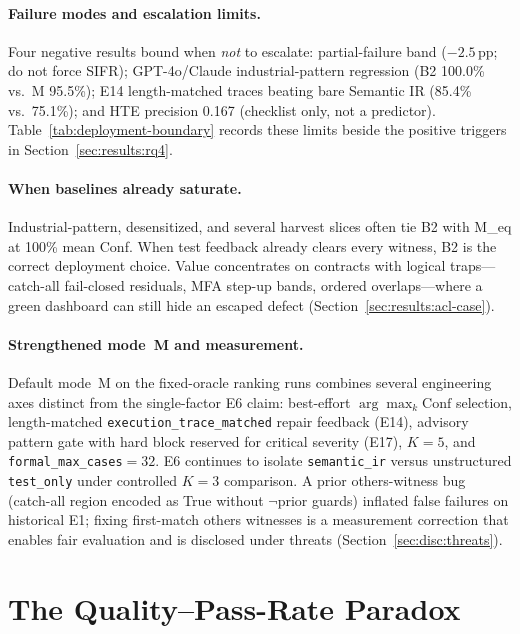 \paragraph{Failure modes and escalation limits.}
Four negative results bound when \emph{not} to escalate: partial-failure band
(${-}2.5$\,pp; do not force SIFR); GPT-4o/Claude industrial-pattern regression
(B2 100.0\% vs.\ M 95.5\%); E14 length-matched traces beating bare Semantic IR
(85.4\% vs.\ 75.1\%); and HTE precision 0.167 (checklist only, not a
predictor).
Table~\ref{tab:deployment-boundary} records these limits beside the positive
triggers in Section~\ref{sec:results:rq4}.


\paragraph{When baselines already saturate.}
Industrial-pattern, desensitized, and several harvest slices often tie B2 with
M\_eq at 100\% mean Conf.
When test feedback already clears every witness, B2 is the correct deployment
choice.
Value concentrates on contracts with logical traps---catch-all fail-closed
residuals, MFA step-up bands, ordered overlaps---where a green dashboard can
still hide an escaped defect (Section~\ref{sec:results:acl-case}).


\paragraph{Strengthened mode~M and measurement.}
Default mode~M on the fixed-oracle ranking runs combines several engineering
axes distinct from the single-factor E6 claim: best-effort
$\arg\max_k\mathrm{Conf}$ selection, length-matched
\texttt{execution\_trace\_matched} repair feedback (E14), advisory pattern
gate with hard block reserved for critical severity (E17), $K{=}5$, and
\texttt{formal\_max\_cases}${=}32$.
E6 continues to isolate \texttt{semantic\_ir} versus unstructured
\texttt{test\_only} under controlled $K{=}3$ comparison.
A prior others-witness bug (catch-all region encoded as True without
$\neg$prior guards) inflated false failures on historical E1; fixing
first-match others witnesses is a measurement correction that enables fair
evaluation and is disclosed under threats
(Section~\ref{sec:disc:threats}).


\section{The Quality--Pass-Rate Paradox}
\label{sec:disc:paradox}

